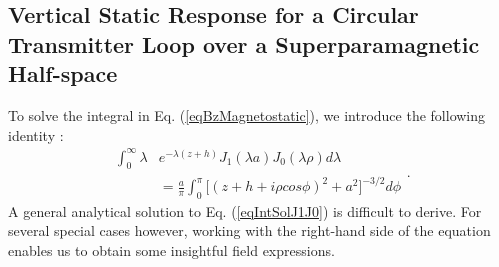 \documentclass[journal]{IEEEtran}  %
\begin{document}

\subsection{Vertical Static Response for a Circular Transmitter Loop over a Superparamagnetic Half-space}
\label{secVertical} To solve the integral in Eq.
(\ref{eqBzMagnetostatic}), we introduce the following identity
\cite{Erdelyi1954}:
\begin{equation}
\begin{split}
\int^{\infty}_0 \lambda &e^{-\lambda (z+h)} J_1(\lambda a) J_0 (\lambda \rho) d \lambda \\
&= \frac{a}{\pi} \int_0^\pi \big [ (z +h + i\rho cos\phi )^2 + a^2 \big ]^{-3/2} d\phi
\end{split}.
\label{eqIntSolJ1J0}
\end{equation}
A general analytical solution to Eq. (\ref{eqIntSolJ1J0}) is
difficult to derive. For several special cases however, working with
the right-hand side of the equation enables us to obtain some
insightful field expressions.
\\\\
\end{document}
